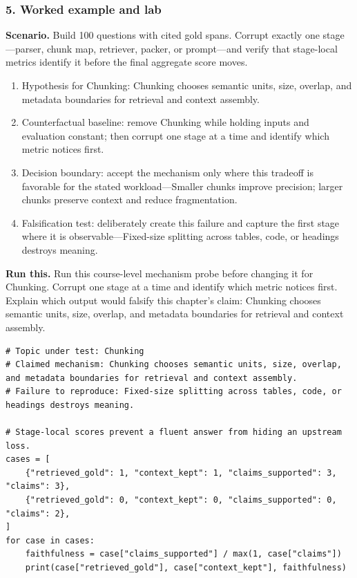 \subsubsection*{5. Worked example and lab}
\textbf{Scenario.} Build 100 questions with cited gold spans. Corrupt exactly one stage—parser, chunk map, retriever, packer, or prompt—and verify that stage-local metrics identify it before the final aggregate score moves.
\begin{enumerate}
\item Hypothesis for Chunking: Chunking chooses semantic units, size, overlap, and metadata boundaries for retrieval and context assembly.
\item Counterfactual baseline: remove Chunking while holding inputs and evaluation constant; then corrupt one stage at a time and identify which metric notices first.
\item Decision boundary: accept the mechanism only where this tradeoff is favorable for the stated workload—Smaller chunks improve precision; larger chunks preserve context and reduce fragmentation.
\item Falsification test: deliberately create this failure and capture the first stage where it is observable—Fixed-size splitting across tables, code, or headings destroys meaning.
\end{enumerate}
\textbf{Run this.} Run this course-level mechanism probe before changing it for Chunking. Corrupt one stage at a time and identify which metric notices first. Explain which output would falsify this chapter's claim: Chunking chooses semantic units, size, overlap, and metadata boundaries for retrieval and context assembly.
\begin{Verbatim}[fontsize=\scriptsize]
# Topic under test: Chunking
# Claimed mechanism: Chunking chooses semantic units, size, overlap, and metadata boundaries for retrieval and context assembly.
# Failure to reproduce: Fixed-size splitting across tables, code, or headings destroys meaning.

# Stage-local scores prevent a fluent answer from hiding an upstream loss.
cases = [
    {"retrieved_gold": 1, "context_kept": 1, "claims_supported": 3, "claims": 3},
    {"retrieved_gold": 0, "context_kept": 0, "claims_supported": 0, "claims": 2},
]
for case in cases:
    faithfulness = case["claims_supported"] / max(1, case["claims"])
    print(case["retrieved_gold"], case["context_kept"], faithfulness)
\end{Verbatim}
